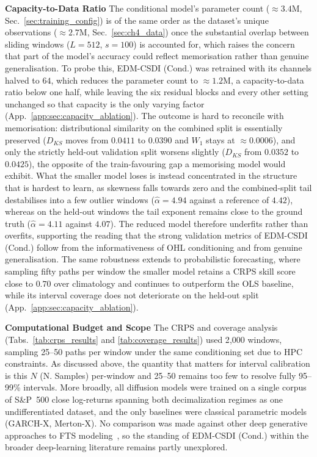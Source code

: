 \textbf{Capacity-to-Data Ratio} \quad The conditional model's parameter count (\(\approx3.4\)M, Sec.\ \ref{sec:training_config}) is of the same order as the dataset's unique observations (\(\approx2.7\)M, Sec.\ \ref{sec:ch4_data}) once the substantial overlap between sliding windows (\(L=512\), \(s=100\)) is accounted for, which raises the concern that part of the model's accuracy could reflect memorisation rather than genuine generalisation. To probe this, EDM-CSDI (Cond.) was retrained with its channels halved to \(64\), which reduces the parameter count to \(\approx1.2\)M, a capacity-to-data ratio below one half, while leaving the six residual blocks and every other setting unchanged so that capacity is the only varying factor (App.\ \ref{app:sec:capacity_ablation}). The outcome is hard to reconcile with memorisation: distributional similarity on the combined split is essentially preserved (\(D_{KS}\) moves from \(0.0411\) to \(0.0390\) and \(W_1\) stays at \(\approx0.0006\)), and only the strictly held-out validation split worsens slightly (\(D_{KS}\) from \(0.0352\) to \(0.0425\)), the opposite of the train-favouring gap a memorising model would exhibit. What the smaller model loses is instead concentrated in the structure that is hardest to learn, as skewness falls towards zero and the combined-split tail destabilises into a few outlier windows (\(\hat{\alpha}=4.94\) against a reference of \(4.42\)), whereas on the held-out windows the tail exponent remains close to the ground truth (\(\hat{\alpha}=4.11\) against \(4.07\)). The reduced model therefore underfits rather than overfits, supporting the reading that the strong validation metrics of EDM-CSDI (Cond.) follow from the informativeness of OHL conditioning and from genuine generalisation. The same robustness extends to probabilistic forecasting, where sampling fifty paths per window the smaller model retains a CRPS skill score close to \(0.70\) over climatology and continues to outperform the OLS baseline, while its interval coverage does not deteriorate on the held-out split (App.\ \ref{app:sec:capacity_ablation}).

\textbf{Computational Budget and Scope} \quad The CRPS and coverage analysis (Tabs.\ \ref{tab:crps_results} and \ref{tab:coverage_results}) used 2{,}000 windows, sampling 25--50 paths per window under the same conditioning set due to HPC constraints. As discussed above, the quantity that matters for interval calibration is this \(N\) (N. Samples) per-window and 25--50 remains too few to resolve fully 95--99\% intervals. More broadly, all diffusion models were trained on a single corpus of S\&P~500 close log-returns spanning both decimalization regimes as one undifferentiated dataset, and the only baselines were classical parametric models (GARCH-X, Merton-X). No comparison was made against other deep generative approaches to FTS modeling\ \cite{yoon2019time,vuletic2024fingan,takahashi2025generation}, so the standing of EDM-CSDI (Cond.) within the broader deep-learning literature remains partly unexplored.

